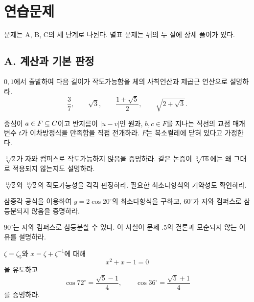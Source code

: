 \clearpage
\section{연습문제}
\label{sec:construction-exercises}

문제는 A, B, C의 세 단계로 나뉜다. 별표 문제는 뒤의 두 절에 상세 풀이가 있다.

\subsection*{A. 계산과 기본 판정}

\begin{exercise}[*]
$0,1$에서 출발하여 다음 길이가 작도가능함을 체의 사칙연산과 제곱근 연산으로 설명하라.
\[
  \frac37,\qquad \sqrt3,\qquad
  \frac{1+\sqrt5}{2},\qquad
  \sqrt{2+\sqrt3}.
\]
\end{exercise}

\begin{exercise}
중심이 $a\in F\subseteq C$이고 반지름이 $|u-v|$인 원과, $b,c\in F$를 지나는 직선의 교점 매개변수 $t$가 이차방정식을 만족함을 직접 전개하라. $F$는 복소켤레에 닫혀 있다고 가정한다.
\end{exercise}

\begin{exercise}[*]
$\sqrt[3]2$가 자와 컴퍼스로 작도가능하지 않음을 증명하라. 같은 논증이 $\sqrt[3]{16}$에는 왜 그대로 적용되지 않는지도 설명하라.
\end{exercise}

\begin{exercise}
$\sqrt[12]2$와 $\sqrt[16]2$의 작도가능성을 각각 판정하라. 필요한 최소다항식의 기약성도 확인하라.
\end{exercise}

\begin{exercise}[*]
삼중각 공식을 이용하여 $y=2\cos20^\circ$의 최소다항식을 구하고, $60^\circ$가 자와 컴퍼스로 삼등분되지 않음을 증명하라.
\end{exercise}

\begin{exercise}
$90^\circ$는 자와 컴퍼스로 삼등분할 수 있다. 이 사실이 문제 \thechapter.5의 결론과 모순되지 않는 이유를 설명하라.
\end{exercise}

\begin{exercise}[*]
$\zeta=\zeta_5$와 $x=\zeta+\zeta^{-1}$에 대해
\[
  x^2+x-1=0
\]
을 유도하고
\[
  \cos72^\circ=\frac{\sqrt5-1}{4},
  \qquad
  \cos36^\circ=\frac{\sqrt5+1}{4}
\]
를 증명하라.
\end{exercise}

